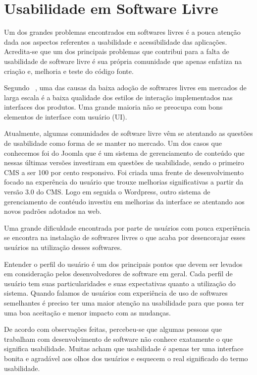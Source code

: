 
\section {Usabilidade em Software Livre}

	Um dos grandes problemas encontrados em softwares livres é a pouca atenção dada aos aspectos referentes a usabilidade e acessibilidade das aplicações. Acredita-se que um dos principais problemas que contribui para a falta de usabilidade de software livre é sua própria comunidade que apenas enfatiza na criação e, melhoria e teste do código fonte.  

Segundo ~, uma das causas da baixa adoção de softwares livres em mercados de larga escala é a baixa qualidade dos estilos de interação implementados nas interfaces dos produtos. Uma grande maioria não se preocupa com bons elementos de interface com usuário (UI). 

Atualmente, algumas comunidades de software livre vêm se atentando as questões de usabilidade como forma de se manter no mercado. Um dos casos que conhecemos foi do Joomla que é um sistema de gerenciamento de conteúdo  que nessas últimas versões investiram em questões de usabilidade, sendo o primeiro CMS a ser 100 por cento responsivo. Foi criada uma frente de desenvolvimento focado na experência do usuário que trouxe melhorias significativas a partir da versão 3.0 do CMS. Logo em seguida o Wordpress, outro sistema de gerenciamento de contéudo investiu em melhorias da interface se atentando aos novos padrões adotados na web.

	Uma grande dificuldade encontrada por parte de usuários com pouca experiência se encontra na instalação de softwares livres o que acaba por desencorajar esses usuários na utilização desses softwares.
	
Entender o perfil do usuário é um dos principais pontos que devem ser levados em consideração pelos desenvolvedores de software em geral. Cada perfil de usuário tem suas particularidades e suas expectativas quanto a utilização do sistema. Quando falamos de usuários com experiência de uso de softwares semelhantes é preciso ter uma maior atenção na usabilidade para que possa ter uma boa aceitação e menor impacto com as mudanças.

De acordo com observações feitas, percebeu-se que algumas pessoas que trabalham com desenvolvimento de software não conhece exatamente o que significa usabilidade.  Muitas acham que usabilidade é apenas ter uma interface bonita e agradável aos olhos dos usuários e esquecem o real significado do termo usabilidade. 

